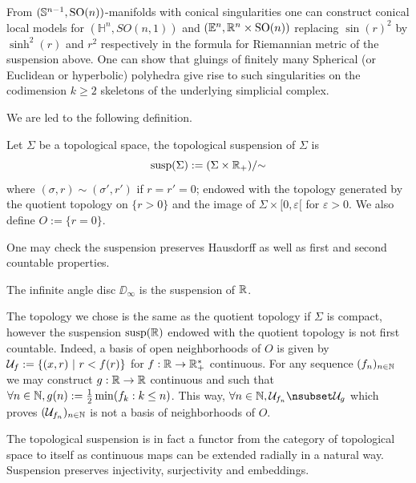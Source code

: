 From $(\mathbb{S}^{n-1},\mathrm{SO}(n))$-manifolds with conical singularities one can construct conical local models for $(\mathbb H^n,SO(n,1))$ and $(\mathbb E^n, \mathbb R^n\times \mathrm{SO}(n))$ replacing $\sin(r)^2$ by $\sinh^2(r)$ and $r^2$ respectively in the 
formula for Riemannian metric of the suspension above. 
One can show that gluings of finitely many Spherical (or Euclidean or hyperbolic) polyhedra give rise to such singularities on the codimension $k\geq 2$ skeletons of the underlying simplicial complex. 

We are led to the following definition.
\begin{defi}\label{def:topological_suspension}
 Let $\Sigma$ be a  topological space, the topological suspension of $\Sigma$ is
 $$ \mathrm{susp}(\Sigma):= (\Sigma \times \mathbb R_+)/{\sim}$$
where $(\sigma,r) \sim (\sigma',r')$ if $r=r'=0$; endowed with the topology generated by the  quotient topology on $\{r>0\}$ and the image of $\Sigma\times [0,\varepsilon[$ for $\varepsilon>0$.
We also define $O:= \{r=0\}$.
 \end{defi}
 \begin{rem}\label{rem:one_may_check_suspension} One may check the suspension preserves Hausdorff as well as first and second countable properties. 
 \end{rem}
 \begin{rem}\label{rem:infinite_angle_disc_suspension} The infinite angle disc $\DD_\infty$ is the suspension of $\mathbb R$.
  
 \end{rem}

\begin{cex}\label{cex:topology_chose_same_quotient} The topology we chose is the same as the quotient topology if $\Sigma$ is compact, however the suspension
 $\mathrm{susp}(\mathbb R)$ endowed with the quotient topology  is not first countable. Indeed, a basis of open neighborhoods of $O$ is given by $\mathcal{U}_f := \{(x,r)~|~ r<f(r)\}$ for $f:\mathbb R\rightarrow \mathbb R_+^*$ continuous. 
 For any sequence $(f_n)_{n\in \mathbb{N}}$ we may construct $g:\mathbb R\rightarrow \mathbb R$ continuous and such that
 $\forall n\in \mathbb{N}, g(n):= \frac{1}{2}\min(f_k : k\leq n )$. 
 This way,  $\forall n\in \N, \U_{f_n} \nsubset \U_g$ which proves $(\mathcal{U}_{f_n})_{n\in \mathbb{N}}$ is not a basis of neighborhoods of $O$.
\end{cex}

\begin{rem}\label{rem:topological_suspension_fact_functor}
 The topological suspension is in fact a functor from the category of topological space to itself as continuous maps can be extended radially in a natural way. Suspension preserves injectivity, surjectivity and embeddings.
\end{rem}

